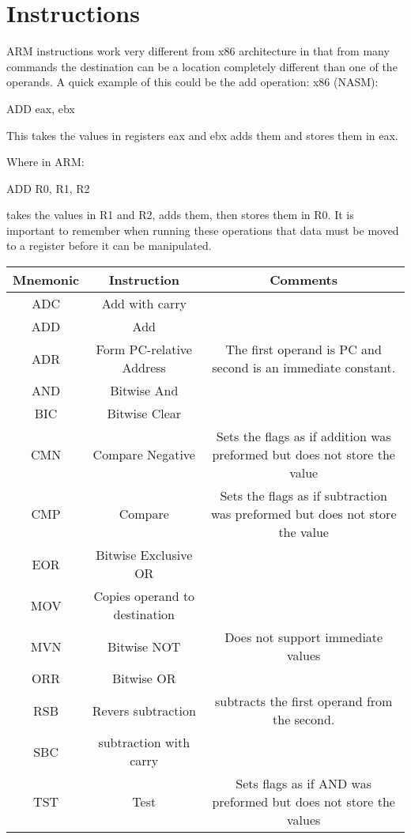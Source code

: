 \documentclass[twoside]{article}
\newenvironment{code}{\fontfamily{lmtt}\selectfont}{}
\begin{document}
	\section{Instructions}
	
	\noindent
	ARM instructions work very different from x86 architecture in that from many commands the destination can be a location completely different than one of the operands. A quick example of this could be the add operation:  
	x86 (NASM):
	
	\begin{code}
		ADD eax, ebx   
	\end{code}  
	
	\noindent
	This takes the values in registers eax and ebx adds them and stores them in eax.
	
	\noindent
	Where in ARM:
	
	
	\begin{code}
		ADD R0, R1, R2
	\end{code}
	
	\noindent
	takes the values in R1 and R2, adds them, then stores them in R0.  
	It is important to remember when running these operations that data must be moved to a register before it can be manipulated.
	
	\begin{center}
		\begin{tabular}{ c c c }
			
			Mnemonic       & Instruction              & Comments      \\
			\hline
			ADC            & Add with carry           & \\
			ADD            & Add                      & \\
			ADR            & Form PC-relative Address & The first operand is PC and second is an immediate constant. \\
			AND            & Bitwise And              & \\
			BIC            & Bitwise Clear            & \\
			CMN            &Compare Negative         & Sets the flags as if addition was preformed but does not store the value \\
			CMP            & Compare                  & Sets the flags as if subtraction was preformed but does not store the value \\
			EOR            & Bitwise Exclusive OR     & \\
			MOV            & Copies operand to destination & \\
			MVN            & Bitwise NOT              & Does not support immediate values \\
			ORR            & Bitwise OR               & \\
			RSB            & Revers subtraction       & subtracts the first operand from the second. \\
			SBC            & subtraction with carry   & \\
			TST            & Test                     & Sets flags as if AND was preformed but does not store the values \\
		\end{tabular}
	\end{center}		
	
\end{document}
